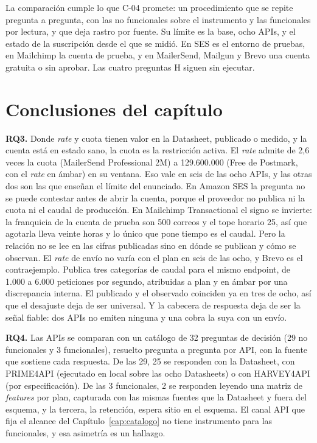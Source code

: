 La comparación cumple lo que C-04 promete: un procedimiento que se repite pregunta a
pregunta, con las no funcionales sobre el instrumento y las funcionales por lectura, y
que deja rastro por fuente. Su límite es la base, ocho APIs, y el estado de la suscripción desde
el que se midió. En SES es el entorno de pruebas, en Mailchimp la cuenta de prueba, y
en MailerSend, Mailgun y Brevo una cuenta gratuita o sin aprobar. Las cuatro preguntas H
siguen sin ejecutar.

\section{Conclusiones del capítulo}
\label{sec:hallazgos:conclusiones}

\textbf{RQ3.} Donde \textit{rate} y cuota tienen valor en la Datasheet, publicado o medido, y la cuenta está en estado sano, la cuota es la restricción activa.
El \textit{rate} admite de 2,6 veces la cuota (MailerSend Professional 2M) a 129.600.000 (Free de Postmark, con el \textit{rate} en ámbar) en su ventana.
Eso vale en seis de las ocho APIs, y las otras dos son las que enseñan el
límite del enunciado. En Amazon SES la pregunta no se puede contestar antes de
abrir la cuenta, porque el proveedor no publica ni la cuota ni el caudal de
producción. En Mailchimp Transactional el signo se invierte: la franquicia de
la cuenta de prueba son 500 correos y el tope horario 25, así que agotarla
lleva veinte horas y lo único que pone tiempo es el caudal.
Pero la relación no se lee en las cifras publicadas sino en dónde se publican y
cómo se observan. El \textit{rate} de envío no varía con el plan en seis de las
ocho, y Brevo es el contraejemplo. Publica tres categorías de caudal para el mismo
endpoint, de 1.000 a 6.000 peticiones por segundo, atribuidas a plan y
en ámbar por una discrepancia interna. El publicado y el observado coinciden ya
en tres de ocho, así que el desajuste deja de ser universal. Y la cabecera de
respuesta deja de ser la señal fiable: dos APIs no emiten ninguna y una cobra
la suya con un envío.

\textbf{RQ4.} Las APIs se comparan con un catálogo de 32 preguntas de decisión
(29 no funcionales y 3 funcionales), resuelto pregunta a pregunta por API, con
la fuente que sostiene cada respuesta. De las 29, 25 se responden con la
Datasheet, con PRIME4API (ejecutado en local sobre las ocho Datasheets) o con
HARVEY4API (por especificación). De las 3 funcionales, 2 se responden leyendo
una matriz de \textit{features} por plan, capturada con las mismas fuentes que
la Datasheet y fuera del esquema, y la tercera, la retención, espera sitio en
el esquema. El canal API que fija el alcance del
Capítulo~\ref{cap:catalogo} no tiene instrumento para las funcionales, y esa
asimetría es un hallazgo.

